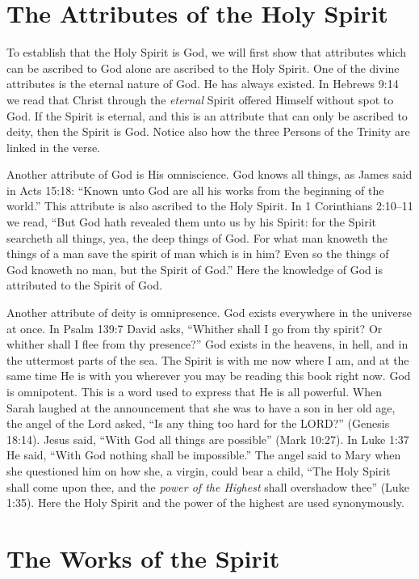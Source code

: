 \section*{The Attributes of the Holy Spirit}

To establish that the Holy Spirit is God, we will first
show that attributes which can be ascribed to God alone
are ascribed to the Holy Spirit. One of the divine attributes
is the eternal nature of God. He has always existed. In
Hebrews 9:14 we read that Christ through the \emph{eternal} Spirit
offered Himself without spot to God. If the Spirit is eternal,
and this is an attribute that can only be ascribed to deity,
then the Spirit is God. Notice also how the three Persons of
the Trinity are linked in the verse.

Another attribute of God is His omniscience. God knows
all things, as James said in Acts 15:18: “Known unto God
are all his works from the beginning of the world.” This
attribute is also ascribed to the Holy Spirit. In 1 Corinthians
2:10–11 we read, “But God hath revealed them unto us by
his Spirit: for the Spirit searcheth all things, yea, the deep
things of God. For what man knoweth the things of a man
save the spirit of man which is in him? Even so the things
of God knoweth no man, but the Spirit of God.” Here the
knowledge of God is attributed to the Spirit of God.

Another attribute of deity is omnipresence. God exists
everywhere in the universe at once. In Psalm 139:7 David
asks, “Whither shall I go from thy spirit? Or whither shall I
flee from thy presence?” God exists in the heavens, in hell,
and in the uttermost parts of the sea. The Spirit is with me
now where I am, and at the same time He is with you wherever
you may be reading this book right now. God is omnipotent.
This is a word used to express that He is all powerful.
When Sarah laughed at the announcement that she was to
have a son in her old age, the angel of the Lord asked, “Is
any thing too hard for the LORD?” (Genesis 18:14). Jesus said,
“With God all things are possible” (Mark 10:27). In Luke
1:37 He said, “With God nothing shall be impossible.” The
angel said to Mary when she questioned him on how she, a
virgin, could bear a child, “The Holy Spirit shall come upon
thee, and the \emph{power of the Highest} shall overshadow thee”
(Luke 1:35). Here the Holy Spirit and the power of the highest
are used synonymously.


\section*{The Works of the Spirit}

